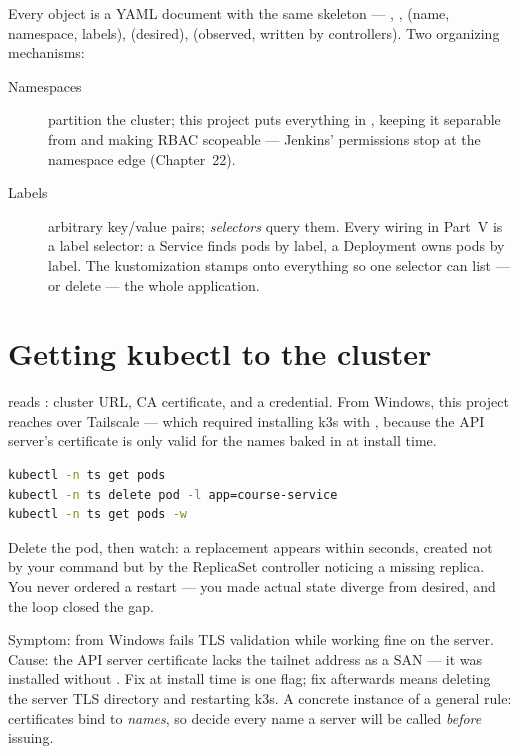 Every object is a YAML document with the same skeleton ---
, ,  (name, namespace,
labels),  (desired),  (observed, written by
controllers). Two organizing mechanisms:

\begin{description}
  \item[Namespaces] partition the cluster; this project puts everything
  in , keeping it separable from  and making
  RBAC scopeable --- Jenkins' permissions stop at the namespace edge
  (Chapter~22).
  \item[Labels] arbitrary key/value pairs; \emph{selectors} query them.
  Every wiring in Part~V is a label selector: a Service finds pods by
  label, a Deployment owns pods by label. The kustomization stamps
   onto everything so
  one selector can list --- or delete --- the whole application.
\end{description}

\section{Getting kubectl to the cluster}

 reads : cluster URL, CA
certificate, and a credential. From Windows, this project reaches
 over Tailscale --- which required
installing k3s with , because the API
server's certificate is only valid for the names baked in at install
time.

\begin{handson}
\begin{lstlisting}[language=bash]
kubectl -n ts get pods
kubectl -n ts delete pod -l app=course-service
kubectl -n ts get pods -w
\end{lstlisting}
Delete the pod, then watch: a replacement appears within seconds,
created not by your command but by the ReplicaSet controller noticing a
missing replica. You never ordered a restart --- you made actual state
diverge from desired, and the loop closed the gap.
\end{handson}

\begin{pitfall}
Symptom:  from Windows fails TLS validation while working
fine on the server. Cause: the API server certificate lacks the
tailnet address as a SAN --- it was installed without
. Fix at install time is one flag; fix afterwards means
deleting the server TLS directory and restarting k3s. A concrete
instance of a general rule: certificates bind to \emph{names}, so
decide every name a server will be called \emph{before} issuing.
\end{pitfall}


